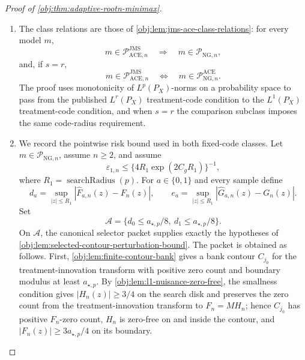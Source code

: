 \begin{proof}[Proof of \cref{obj:thm:adaptive-rootn-minimax}]
\begin{enumerate}
\item The class relations are those of \cref{obj:lem:jms-ace-class-relations}: for every model \(m\),
\[
m\in\mathcal P_{\mathrm{ACE},n}^{\mathrm{JMS}}
\quad\Longrightarrow\quad
m\in\mathcal P_{\mathrm{NG},n},
\]
and, if \(s=r\),
\[
m\in\mathcal P_{\mathrm{ACE},n}^{\mathrm{JMS}}
\quad\Longleftrightarrow\quad
m\in\mathcal P_{\mathrm{NG},n}^{\mathrm{ACE}}.
\]
The proof uses monotonicity of \(L^p(P_X)\)-norms on a probability space to pass from the published \(L^r(P_X)\) treatment-code condition to the \(L^1(P_X)\) treatment-code condition, and when \(s=r\) the comparison subclass imposes the same code-radius requirement. %

\item We record the pointwise risk bound used in both fixed-code classes.  Let \(m\in\mathcal P_{\mathrm{NG},n}\), assume \(n\ge2\), and assume
\[
\varepsilon_{1,n}\le
\{4R_1\exp(2C_gR_1)\}^{-1},
\]
where \(R_1=\operatorname{searchRadius}(p)\).  For \(a\in\{0,1\}\) and every sample define
\[
d_a=\sup_{|z|\le R_1}|\widehat F_{a,n}(z)-F_n(z)|,
\qquad
e_a=\sup_{|z|\le R_1}|\widehat G_{a,n}(z)-G_n(z)|.
\]
Set
\[
\mathcal A=\{d_0\le a_{\star,p}/8,
              \ d_1\le a_{\star,p}/8\}.
\]
On \(\mathcal A\), the canonical selector packet supplies exactly the hypotheses of \cref{obj:lem:selected-contour-perturbation-bound}.  The packet is obtained as follows.  First, \cref{obj:lem:finite-contour-bank} gives a bank contour \(C_{j_0}\) for the treatment-innovation transform with positive zero count and boundary modulus at least \(a_{\star,p}\).  By \cref{obj:lem:l1-nuisance-zero-free}, the smallness condition gives \(|H_n(z)|\ge3/4\) on the search disk and preserves the zero count from the treatment-innovation transform to \(F_n=M H_n\); hence \(C_{j_0}\) has positive \(F_n\)-zero count, \(H_n\) is zero-free on and inside the contour, and \(|F_n(z)|\ge3a_{\star,p}/4\) on its boundary.


\end{enumerate}
\end{proof}
